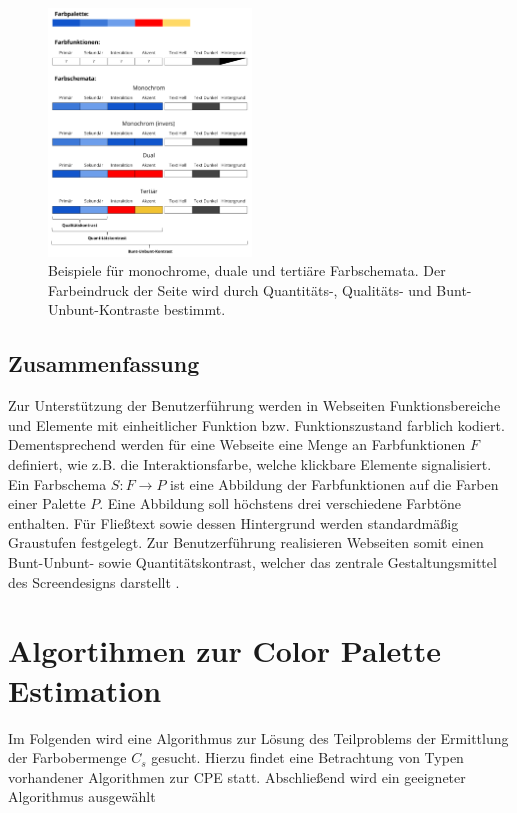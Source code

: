 \documentclass[11pt,a4paper,bibliography=totoc,twocolumn]{scrartcl}
\begin{document}
\begin{figure}[h]
	\centering
	\includegraphics[width=0.48\textwidth]{img/colorschemes.png}
	\caption{Beispiele für monochrome, duale und tertiäre Farbschemata. Der Farbeindruck der Seite wird durch Quantitäts-, Qualitäts- und Bunt-Unbunt-Kontraste bestimmt.}
	\label{fig:colorschemes}
\end{figure}

\subsection*{Zusammenfassung}
Zur Unterstützung der Benutzerführung werden in Webseiten Funktionsbereiche und Elemente mit einheitlicher Funktion bzw. Funktionszustand farblich kodiert. Dementsprechend werden für eine Webseite eine Menge an Farbfunktionen $F$ definiert, wie z.B. die Interaktionsfarbe, welche klickbare Elemente signalisiert. Ein Farbschema $S: F \to P$ ist eine Abbildung der Farbfunktionen auf die Farben einer Palette $P$. Eine Abbildung soll höchstens drei verschiedene Farbtöne enthalten. Für Fließtext sowie dessen Hintergrund werden standardmäßig Graustufen festgelegt. Zur Benutzerführung realisieren Webseiten somit einen Bunt-Unbunt- sowie Quantitätskontrast, welcher das zentrale Gestaltungsmittel des Screendesigns darstellt \citep{webdesign, webx0}.

\section{Algortihmen zur Color Palette Estimation}

Im Folgenden wird eine Algorithmus zur Lösung des Teilproblems der Ermittlung der Farbobermenge $C_s$ gesucht. Hierzu findet eine Betrachtung von Typen vorhandener Algorithmen zur CPE statt. Abschließend wird ein geeigneter Algorithmus ausgewählt
\end{document}
